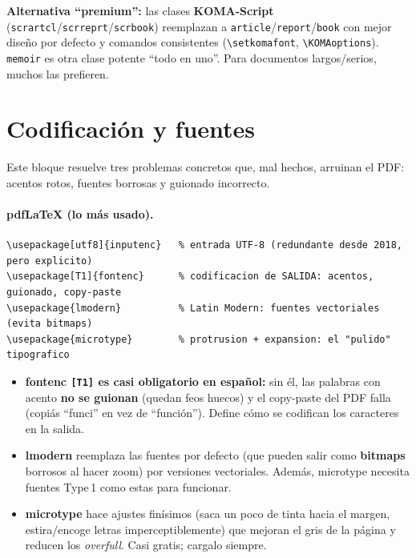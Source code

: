 \documentclass[11pt,a4paper]{article}
\newcommand{\C}[1]{\texttt{\textbackslash #1}}
\newcommand{\pkg}[1]{\textsf{#1}}
\begin{document}
\noindent\textbf{Alternativa \enquote{premium}:} las clases \textbf{KOMA-Script}
(\texttt{scrartcl}/\texttt{scrreprt}/\texttt{scrbook}) reemplazan a
\texttt{article}/\texttt{report}/\texttt{book} con mejor diseño por defecto y
comandos consistentes (\C{setkomafont}, \C{KOMAoptions}). \texttt{memoir} es otra
clase potente \enquote{todo en uno}. Para documentos largos/serios, muchos las
prefieren.

\section{Codificación y fuentes}
Este bloque resuelve tres problemas concretos que, mal hechos, arruinan el PDF:
acentos rotos, fuentes borrosas y guionado incorrecto.

\paragraph{pdfLaTeX (lo más usado).}
\begin{lstlisting}
\usepackage[utf8]{inputenc}   % entrada UTF-8 (redundante desde 2018, pero explicito)
\usepackage[T1]{fontenc}      % codificacion de SALIDA: acentos, guionado, copy-paste
\usepackage{lmodern}          % Latin Modern: fuentes vectoriales (evita bitmaps)
\usepackage{microtype}        % protrusion + expansion: el "pulido" tipografico
\end{lstlisting}
\begin{itemize}[noitemsep,leftmargin=*]
  \item \textbf{\pkg{fontenc} \texttt{[T1]} es casi obligatorio en español:} sin
        él, las palabras con acento \textbf{no se guionan} (quedan feos huecos) y
        el copy-paste del PDF falla (copiás \enquote{funci} en vez de
        \enquote{función}). Define cómo se codifican los caracteres en la salida.
  \item \textbf{\pkg{lmodern}} reemplaza las fuentes por defecto (que pueden salir
        como \textbf{bitmaps} borrosos al hacer zoom) por versiones vectoriales.
        Además, \pkg{microtype} necesita fuentes Type\,1 como estas para funcionar.
  \item \textbf{\pkg{microtype}} hace ajustes finísimos (saca un poco de tinta
        hacia el margen, estira/encoge letras imperceptiblemente) que mejoran el
        gris de la página y reducen los \emph{overfull}. Casi gratis; cargalo
        siempre.
\end{itemize}
\end{document}
